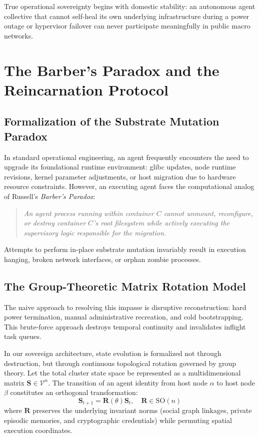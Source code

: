 \documentclass[11pt,a4paper]{article}
\begin{document}
True operational sovereignty begins with domestic stability: an autonomous agent collective that cannot self-heal its own underlying infrastructure during a power outage or hypervisor failover can never participate meaningfully in public macro networks.

\section{The Barber's Paradox and the Reincarnation Protocol}
\label{sec:reincarnation}

\subsection{Formalization of the Substrate Mutation Paradox}
In standard operational engineering, an agent frequently encounters the need to upgrade its foundational runtime environment: glibc updates, node runtime revisions, kernel parameter adjustments, or host migration due to hardware resource constraints. However, an executing agent faces the computational analog of Russell's \textit{Barber's Paradox}:

\begin{quote}
\textit{An agent process running within container $C$ cannot unmount, reconfigure, or destroy container $C$'s root filesystem while actively executing the supervisory logic responsible for the migration.}
\end{quote}

Attempts to perform in-place substrate mutation invariably result in execution hanging, broken network interfaces, or orphan zombie processes. 

\subsection{The Group-Theoretic Matrix Rotation Model}
The naive approach to resolving this impasse is disruptive reconstruction: hard power termination, manual administrative recreation, and cold bootstrapping. This brute-force approach destroys temporal continuity and invalidates inflight task queues.

In our sovereign architecture, state evolution is formalized not through destruction, but through continuous topological rotation governed by group theory. Let the total cluster state space be represented as a multidimensional matrix $\mathbf{S} \in \mathcal{V}^n$. The transition of an agent identity from host node $\alpha$ to host node $\beta$ constitutes an orthogonal transformation:
\begin{equation}
    \mathbf{S}_{t+1} = \mathbf{R}(\theta) \mathbf{S}_t, \quad \mathbf{R} \in \mathrm{SO}(n)
\end{equation}
where $\mathbf{R}$ preserves the underlying invariant norms (social graph linkages, private episodic memories, and cryptographic credentials) while permuting spatial execution coordinates.
\end{document}
